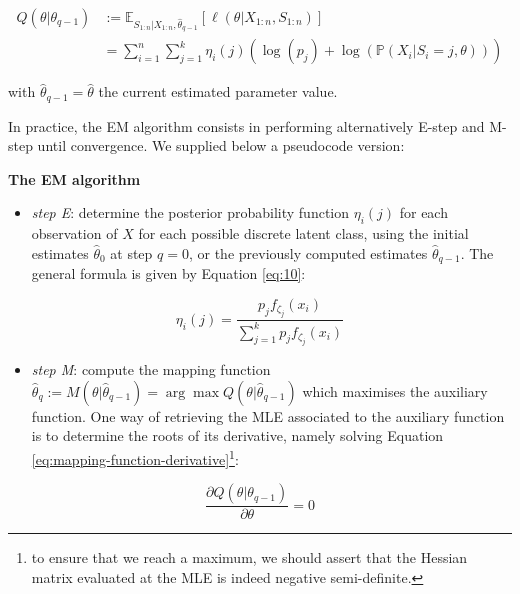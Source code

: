 \begin{equation}
\begin{split}
Q(\theta|\theta_{q-1}) & := \mathbb{E}_{S_{1:n}| X_{1:n}, \hat{\theta}_{q-1}} \left[\ell(\theta | X_{1:n}, S_{1:n})\right] \\
&=\sum_{i=1}^n \sum_{j=1}^k \eta_{i}(j) \left( \log (p_j) +  \log (\mathbb{P}(X_i|S_i=j, \theta)) \right)
\end{split}
\label{eq:8}
\end{equation}

with \(\hat{\theta}_{q-1}=\hat{\theta}\) the current estimated parameter
value.

In practice, the EM algorithm consists in performing alternatively E-step and M-step until convergence. We supplied below a pseudocode version:

\begin{blackbox}{\textbf{The EM algorithm}}

\begin{center}

\begin{itemize}
\tightlist
\item
  \emph{step E}: determine the posterior probability function \(\eta_i(j)\)
  for each observation of \(X\) for each possible discrete latent class,
  using the initial estimates \(\hat{\theta}_0\) at step \(q=0\), or the
  previously computed estimates \(\hat{\theta}_{q-1}\). The general formula is given by Equation \eqref{eq:10}:
\end{itemize}

\begin{equation}
    \eta_i(j) = \frac{p_j f_{\zeta_j} (x_i)}{\sum_{j=1}^k p_j f_{\zeta_j} (x_i)}
\label{eq:10}
\end{equation}

\begin{itemize}
\tightlist
\item
  \emph{step M}: compute the mapping function
  \(\hat{\theta}_q:=M(\theta | \hat{\theta}_{q-1})=\arg \max Q(\theta| \hat{\theta}_{q-1})\) which maximises the auxiliary function. One way of retrieving the MLE associated to the auxiliary function is to determine the roots of its derivative, namely solving Equation \eqref{eq:mapping-function-derivative}\footnote{to ensure
    that we reach a maximum, we should assert that the Hessian matrix evaluated at the MLE is indeed negative semi-definite.}:
\end{itemize}

\begin{equation}
    \frac{\partial Q(\theta| \theta_{q-1})}{\partial \theta}=0
\label{eq:mapping-function-derivative}
\end{equation}

\end{center}

\end{blackbox}

